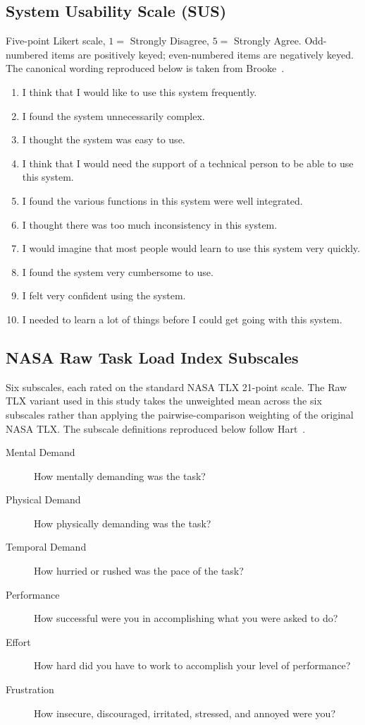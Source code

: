 \subsection{System Usability Scale (SUS)}
\label{app:sus-items}

Five-point Likert scale, $1 = $ Strongly Disagree, $5 = $ Strongly
Agree. Odd-numbered items are positively keyed; even-numbered
items are negatively keyed. The canonical wording reproduced below
is taken from Brooke~\cite{Brooke1996}.

\begin{enumerate}
    \item I think that I would like to use this system frequently.
    \item I found the system unnecessarily complex.
    \item I thought the system was easy to use.
    \item I think that I would need the support of a technical person to be able to use this system.
    \item I found the various functions in this system were well integrated.
    \item I thought there was too much inconsistency in this system.
    \item I would imagine that most people would learn to use this system very quickly.
    \item I found the system very cumbersome to use.
    \item I felt very confident using the system.
    \item I needed to learn a lot of things before I could get going with this system.
\end{enumerate}

\subsection{NASA Raw Task Load Index Subscales}
\label{app:rtlx-items}

Six subscales, each rated on the standard NASA TLX 21-point
scale. The Raw TLX variant used in this study takes the
unweighted mean across the six subscales rather than applying the
pairwise-comparison weighting of the original NASA TLX. The
subscale definitions reproduced below follow Hart~\cite{Hart2006}.

\begin{description}
    \item[Mental Demand] How mentally demanding was the task?
    \item[Physical Demand] How physically demanding was the task?
    \item[Temporal Demand] How hurried or rushed was the pace of the task?
    \item[Performance] How successful were you in accomplishing what you were asked to do?
    \item[Effort] How hard did you have to work to accomplish your level of performance?
    \item[Frustration] How insecure, discouraged, irritated, stressed, and annoyed were you?
\end{description}


